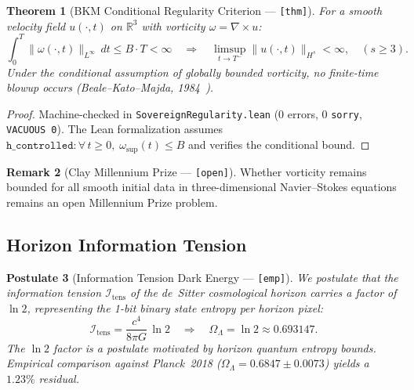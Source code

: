 \documentclass[12pt,letterpaper]{article}
\theoremstyle{plain}
\newtheorem{theorem}{Theorem}[section]
\newtheorem{postulate}[theorem]{Postulate}
\theoremstyle{definition}
\newtheorem{remark}[theorem]{Remark}
\begin{document}
\begin{theorem}[BKM Conditional Regularity Criterion --- {\normalfont\texttt{[thm]}}]
\label{thm:bkm}
For a smooth velocity field $u(\cdot,t)$ on $\mathbb{R}^3$ with vorticity $\omega = \nabla \times u$:
\begin{equation}\label{eq:bkm}
  \int_0^T \|\omega(\cdot,t)\|_{L^\infty}\,dt \le B \cdot T < \infty
  \quad\Longrightarrow\quad
  \limsup_{t \to T^-} \|u(\cdot,t)\|_{H^s} < \infty, \quad (s \ge 3).
\end{equation}
Under the \emph{conditional assumption} of globally bounded vorticity, no finite-time blowup occurs (Beale--Kato--Majda, 1984~\cite{bkm1984}).
\end{theorem}

\begin{proof}
Machine-checked in \texttt{SovereignRegularity.lean} (0 errors, 0 \texttt{sorry}, \texttt{VACUOUS\,0}). The Lean formalization assumes $\texttt{h\_controlled}: \forall\, t \ge 0,\; \omega_{\sup}(t) \le B$ and verifies the conditional bound.
\end{proof}

\begin{remark}[Clay Millennium Prize --- {\normalfont\texttt{[open]}}]\label{rem:clay}
Whether vorticity remains bounded for all smooth initial data in three-dimensional Navier--Stokes equations remains an open Millennium Prize problem.
\end{remark}

\subsection{Horizon Information Tension}

\begin{postulate}[Information Tension Dark Energy --- {\normalfont\texttt{[emp]}}]
\label{post:dark_energy}
We postulate that the information tension $\mathcal{I}_{\mathrm{tens}}$ of the de~Sitter cosmological horizon carries a factor of $\ln 2$, representing the 1-bit binary state entropy per horizon pixel:
\begin{equation}\label{eq:info_tension}
  \mathcal{I}_{\mathrm{tens}} = \frac{c^4}{8\pi G}\,\ln 2
  \quad\Longrightarrow\quad
  \Omega_\Lambda = \ln 2 \approx 0.693147.
\end{equation}
The $\ln 2$ factor is a postulate motivated by horizon quantum entropy bounds. Empirical comparison against Planck~2018 ($\Omega_\Lambda = 0.6847 \pm 0.0073$) yields a $1.23\%$ residual.
\end{postulate}
\end{document}
